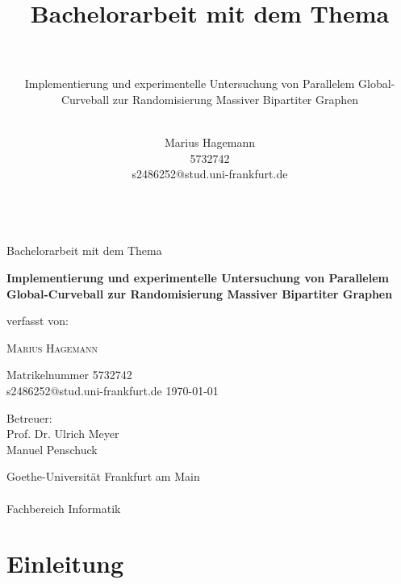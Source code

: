 \documentclass[a4paper]{scrreprt}
\title{Bachelorarbeit mit dem Thema \\ ~}
\subtitle{ Implementierung und experimentelle Untersuchung von Parallelem Global-Curveball zur Randomisierung
Massiver Bipartiter Graphen\\ ~}
\author{Marius Hagemann \\ 5732742 \\ s2486252@stud.uni-frankfurt.de \\~}
\theoremstyle{plain} %
\theoremstyle{definition} %
\begin{document}
	

\begin{titlepage}
	\centering
	{\LARGE Bachelorarbeit mit dem Thema\par}
	\vfill
	{\huge\bfseries Implementierung und experimentelle Untersuchung von Parallelem Global-Curveball zur Randomisierung
Massiver Bipartiter Graphen\par}
	\vspace{2.5cm}
	{\Large verfasst von: \par}
	\vspace{1cm}
	{\LARGE \scshape Marius Hagemann\par}
	\vspace{0.5cm}
	{\large Matrikelnummer 5732742 \\ s2486252@stud.uni-frankfurt.de}
	\vfill
	{\Large \today}
	\vfill
	{\LARGE Betreuer:\\ Prof. Dr. Ulrich Meyer \\ Manuel Penschuck\par}
	\vspace{1.5cm}
	{\LARGE Goethe-Universität Frankfurt am Main \\ ~\\ Fachbereich Informatik}
\end{titlepage}



\cleardoublepage 





\newpage

\tableofcontents


\chapter{Einleitung}
\end{document}
